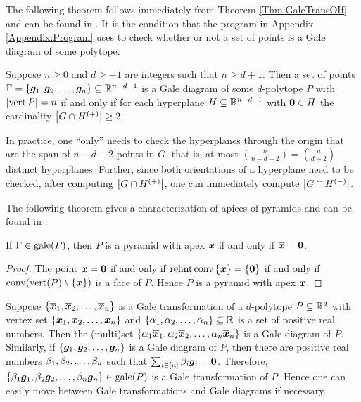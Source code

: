 The following theorem follows immediately from Theorem \ref{Thm:GaleTransOIf} and can be found in \cite{McMullenBook}.  It is the condition that the program in Appendix \ref{Appendix:Program} uses to check whether or not a set of points is a Gale diagram of some polytope.

\begin{Theorem}
    Suppose \(n\ge0\) and \(d\ge-1\) are integers such that \(n\ge d+1\).  Then a set of points \(\Gamma=\left\{\bm{g}_1,\bm{g}_2,\dotsc,\bm{g}_n\right\}\subseteq\mathbb{R}^{n-d-1}\) is a Gale diagram of some \(d\)-polytope \(P\) with \(\left\lvert\operatorname{vert} P\right\rvert=n\) if and only if for each hyperplane \(H\subseteq\mathbb{R}^{n-d-1}\) with \(\bm{0}\in H\) the cardinality \(\left\lvert G\cap H^{(+)}\right\rvert\ge 2\).
\end{Theorem}

In practice, one ``only'' needs to check the hyperplanes through the origin that are the span of \(n-d-2\) points in \(G\), that is, at most \(\binom{n}{n-d-2}=\binom{n}{d+2}\) distinct hyperplanes.  Further, since both orientations of a hyperplane need to be checked, after computing \(\left\lvert G\cap H^{(+)}\right\rvert\), one can immediately compute \(\left\lvert G\cap H^{(-)}\right\rvert\).


The following theorem gives a characterization of apices of pyramids and can be found in \cite{McMullenBook}.
\begin{Theorem}\label{Thm:GalePyr}
    If \(\Gamma\in\operatorname{gale}(P)\), then \(P\) is a pyramid with apex \(\bm{x}\) if and only if \(\overline{\bm{x}}=\bm{0}\).
\end{Theorem}
\begin{proof}
    The point \(\overline{\bm{x}}=\bm{0}\) if and only if \(\operatorname{relint}\operatorname{conv}\left\{\overline{\bm{x}}\right\}=\left\{\bm{0}\right\}\) if and only if \(\operatorname{conv}(\operatorname{vert}(P)\setminus\left\{\bm{x}\right\})\) is a face of \(P\).  Hence \(P\) is a pyramid with apex \(\bm{x}\).
\end{proof}

Suppose \(\left\{\overline{\bm{x}}_1,\overline{\bm{x}}_2,\dotsc,\overline{\bm{x}}_n\right\}\) is a Gale transformation of a \(d\)-polytope \(P\subseteq \mathbb{R}^{d}\) with vertex set \(\left\{\bm{x}_1,\bm{x}_2,\dotsc,\bm{x}_n\right\}\) and \(\left\{\alpha_1,\alpha_2,\dotsc,\alpha_n\right\}\subseteq\mathbb{R}\) is a set of positive real numbers.  Then the (multi)set \(\left\{\alpha_1\overline{\bm{x}}_1,\alpha_2\overline{\bm{x}}_2,\dotsc,\alpha_n\overline{\bm{x}}_n\right\}\) is a Gale diagram of \(P\).  Similarly, if \(\left\{\bm{g}_1,\bm{g}_2,\dotsc,\bm{g}_n\right\}\) is a Gale diagram of \(P\), then there are positive real numbers \(\beta_1,\beta_2,\dotsc,\beta_n\) such that \(\sum_{i\in\left[n\right]}\beta_i\bm{g}_i=\bm{0}\).  Therefore, \(\left\{\beta_1\bm{g}_1,\beta_2\bm{g}_2,\dotsc,\beta_n\bm{g}_n\right\}\in\operatorname{gale}(P)\) is a Gale transformation of \(P\).  Hence one can easily move between Gale transformations and Gale diagrams if necessary.

